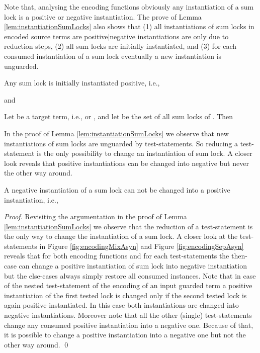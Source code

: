 \documentclass[]{llncs}
\begin{document}
Note that, analysing the encoding functions obviously any instantiation of a sum lock is a positive or negative instantiation. The prove of Lemma \ref{lem:instantiationSumLocks} also shows that (1) all instantiations of sum locks in encoded source terms are positive|negative instantiations are only due to reduction steps, (2) all sum locks are initially instantiated, and (3) for each consumed instantiation of a sum lock eventually a new instantiation is unguarded.
\begin{corollary} \label{col:initialSumLocksArePositive}
	Any sum lock is initially instantiated positive, i.e.,
	
	and
	
\end{corollary}

\begin{corollary} \label{col:instantiationsSumLocksAreRestored}
	Let  be a target term, i.e.,  or , and let  be the set of all sum locks of . Then
	
\end{corollary}

In the proof of Lemma \ref{lem:instantiationSumLocks} we observe that new instantiations of sum locks are unguarded by test-statements. So reducing a test-statement is the only possibility to change an instantiation of sum lock. A closer look reveals that positive instantiations can be changed into negative but never the other way around.

\begin{lemma} \label{lem:changeInstantiationSumLock}
	A negative instantiation of a sum lock can not be changed into a positive instantiation, i.e.,
	
\end{lemma}

\begin{proof}
	Revisiting the argumentation in the proof of Lemma \ref{lem:instantiationSumLocks} we observe that the reduction of a test-statement is the only way to change the instantiation of a sum lock. A closer look at the test-statements in Figure \ref{fig:encodingMixAsyn} and Figure \ref{fig:encodingSepAsyn} reveals that for both encoding functions and for each test-statements the then-case can change a positive instantiation of sum lock into negative instantiation but the else-cases always simply restore all consumed instances. Note that in case of the nested test-statement of the encoding of an input guarded term a positive instantiation of the first tested lock is changed only if the second tested lock is again positive instantiated. In this case both instantiations are changed into negative instantiations. Moreover note that all the other (single) test-statements change any consumed positive instantiation into a negative one. Because of that, it is possible to change a positive instantiation into a negative one but not the other way around.
	\qed
\end{proof}
\end{document}

